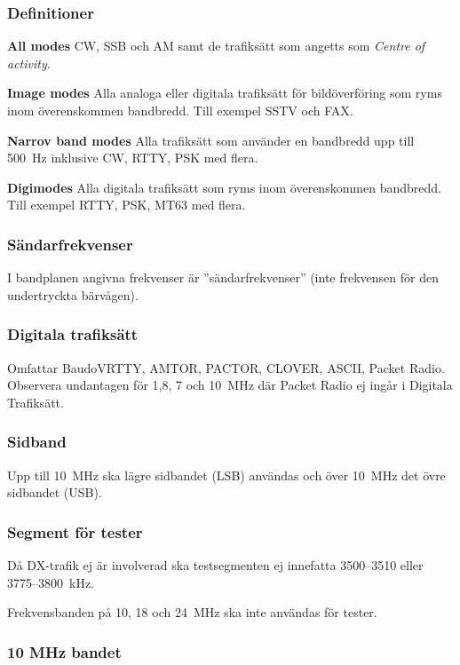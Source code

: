 \subsubsection{Definitioner}

\textbf{All modes} CW, SSB och AM samt de trafiksätt som angetts som
\emph{Centre of activity}.

\textbf{Image modes} Alla analoga eller digitala trafiksätt för bildöverföring
som ryms inom överenskommen bandbredd. Till exempel SSTV och FAX.

\textbf{Narrov band modes} Alla trafiksätt som använder en bandbredd upp till
500~Hz inklusive CW, RTTY, PSK med flera.

\textbf{Digimodes} Alla digitala trafiksätt som ryms inom överenskommen
bandbredd. Till exempel RTTY, PSK, MT63 med flera.
 
\subsubsection{Sändarfrekvenser}

I bandplanen angivna frekvenser är ''sändarfrekvenser''
(inte frekvensen för den undertryckta bärvågen).

\subsubsection{Digitala trafiksätt}

Omfattar BaudoVRTTY, AMTOR, PACTOR, CLOVER, ASCII, Packet Radio.
Observera undantagen för 1,8, 7 och 10~MHz där Packet Radio ej
ingår i Digitala Trafiksätt.

\subsubsection{Sidband}

Upp till 10~MHz ska lägre sidbandet (LSB) användas och över 10~MHz det övre
sidbandet (USB).

\subsubsection{Segment för tester}

Då DX-trafik ej är involverad ska testsegmenten ej innefatta
3500--3510 eller 3775--3800~kHz.

Frekvensbanden på 10, 18 och 24~MHz ska inte användas för tester.

\subsubsection{10 MHz bandet}

